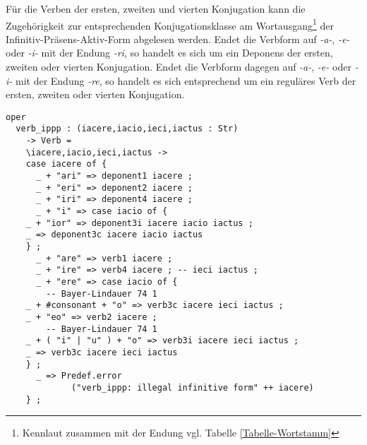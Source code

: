 Für die Verben der ersten, zweiten und vierten Konjugation kann die Zugehörigkeit zur entsprechenden Konjugationsklasse am Wortausgang\footnote{Kennlaut zusammen mit der Endung vgl. Tabelle \ref{Tabelle-Wortstamm}} der Infinitiv-Präsens-Aktiv-Form abgelesen werden. Endet die Verbform auf \textit{-a-}, \textit{-e-} oder \textit{-i-} mit der Endung \textit{-ri}, so handelt es sich um ein Deponens der ersten, zweiten oder vierten Konjugation. Endet die Verbform dagegen auf \textit{-a-}, \textit{-e-} oder \textit{-i-} mit der Endung \textit{-re}, so handelt es sich entsprechend um ein reguläres Verb der ersten, zweiten oder vierten Konjugation. \par
\begin{lstlisting}[float=h!tp,caption={Smart Paradigm für vier Verbformen (vgl. \textbf{MorphoLat.gf})},label={GF-Morpho-Verb-Ippp},basicstyle=\small]
oper
  verb_ippp : (iacere,iacio,ieci,iactus : Str) 
    -> Verb = 
    \iacere,iacio,ieci,iactus ->
    case iacere of {
      _ + "ari" => deponent1 iacere ;
      _ + "eri" => deponent2 iacere ;
      _ + "iri" => deponent4 iacere ;
      _ + "i" => case iacio of {
  	_ + "ior" => deponent3i iacere iacio iactus ;
  	_ => deponent3c iacere iacio iactus
  	} ;
      _ + "are" => verb1 iacere ;
      _ + "ire" => verb4 iacere ; -- ieci iactus ;
      _ + "ere" => case iacio of {
        -- Bayer-Lindauer 74 1
  	_ + #consonant + "o" => verb3c iacere ieci iactus ; 
  	_ + "eo" => verb2 iacere ;
        -- Bayer-Lindauer 74 1
  	_ + ( "i" | "u" ) + "o" => verb3i iacere ieci iactus ; 
  	_ => verb3c iacere ieci iactus
  	} ;
      _ => Predef.error 
             ("verb_ippp: illegal infinitive form" ++ iacere) 
    } ;
\end{lstlisting}

